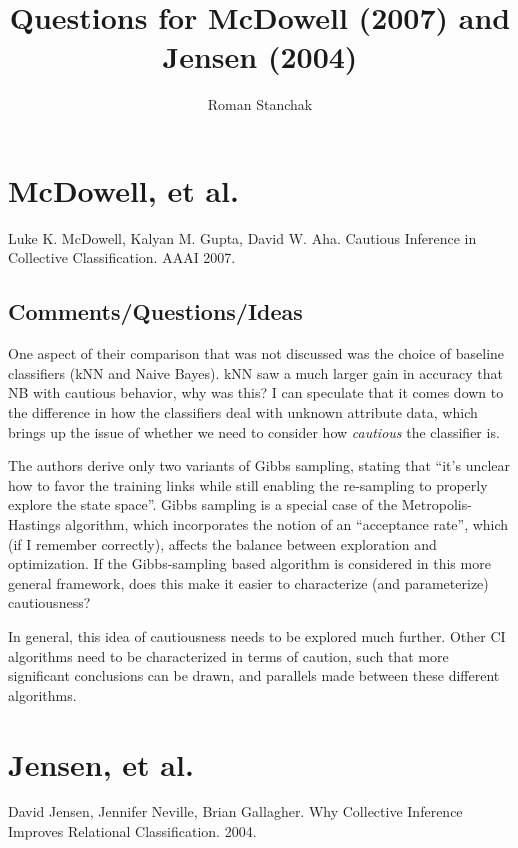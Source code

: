 \documentclass[11pt]{article}
\begin{document}
%
\title{Questions for McDowell (2007) and Jensen (2004)}
\author{Roman Stanchak}
\maketitle

\section*{McDowell, et al.}

Luke K. McDowell, Kalyan M. Gupta, David W. Aha. Cautious Inference in Collective Classification. 
AAAI 2007. 

\subsection*{Comments/Questions/Ideas}

One aspect of their comparison that was not discussed was the choice of
baseline classifiers (kNN and Naive Bayes).  kNN saw a much larger gain in
accuracy that NB with cautious behavior, why was this?  I can speculate that it
comes down to the difference in how the classifiers deal with unknown attribute
data, which brings up the issue of whether we need to consider how
\textit{cautious} the classifier is.

The authors derive only two variants of Gibbs sampling, stating that ``it's
unclear how to favor the training links while still enabling the re-sampling to
properly explore the state space''.  Gibbs sampling is a
special case of the Metropolis-Hastings algorithm, which incorporates the notion 
of an ``acceptance rate'', which (if I remember correctly), affects the balance 
between exploration and optimization.  If the Gibbs-sampling based 
algorithm is considered in this more general framework, does this make it easier
to characterize (and parameterize) cautiousness?

In general, this idea of cautiousness needs to be explored much further.
Other CI algorithms need to be characterized in terms of caution, such that
more significant conclusions can be drawn, and parallels made between these different
algorithms.

\section*{Jensen, et al.}

David Jensen, Jennifer Neville, Brian Gallagher. Why Collective Inference
Improves Relational Classification. 2004. 
\end{document}
